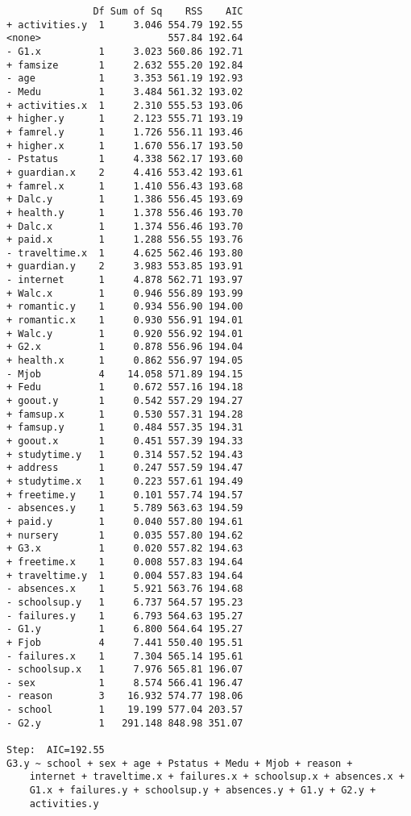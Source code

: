 \documentclass[11pt]{article}
\begin{document}
\begin{enumerate}
\begin{verbatim}
               Df Sum of Sq    RSS    AIC
+ activities.y  1     3.046 554.79 192.55
<none>                      557.84 192.64
- G1.x          1     3.023 560.86 192.71
+ famsize       1     2.632 555.20 192.84
- age           1     3.353 561.19 192.93
- Medu          1     3.484 561.32 193.02
+ activities.x  1     2.310 555.53 193.06
+ higher.y      1     2.123 555.71 193.19
+ famrel.y      1     1.726 556.11 193.46
+ higher.x      1     1.670 556.17 193.50
- Pstatus       1     4.338 562.17 193.60
+ guardian.x    2     4.416 553.42 193.61
+ famrel.x      1     1.410 556.43 193.68
+ Dalc.y        1     1.386 556.45 193.69
+ health.y      1     1.378 556.46 193.70
+ Dalc.x        1     1.374 556.46 193.70
+ paid.x        1     1.288 556.55 193.76
- traveltime.x  1     4.625 562.46 193.80
+ guardian.y    2     3.983 553.85 193.91
- internet      1     4.878 562.71 193.97
+ Walc.x        1     0.946 556.89 193.99
+ romantic.y    1     0.934 556.90 194.00
+ romantic.x    1     0.930 556.91 194.01
+ Walc.y        1     0.920 556.92 194.01
+ G2.x          1     0.878 556.96 194.04
+ health.x      1     0.862 556.97 194.05
- Mjob          4    14.058 571.89 194.15
+ Fedu          1     0.672 557.16 194.18
+ goout.y       1     0.542 557.29 194.27
+ famsup.x      1     0.530 557.31 194.28
+ famsup.y      1     0.484 557.35 194.31
+ goout.x       1     0.451 557.39 194.33
+ studytime.y   1     0.314 557.52 194.43
+ address       1     0.247 557.59 194.47
+ studytime.x   1     0.223 557.61 194.49
+ freetime.y    1     0.101 557.74 194.57
- absences.y    1     5.789 563.63 194.59
+ paid.y        1     0.040 557.80 194.61
+ nursery       1     0.035 557.80 194.62
+ G3.x          1     0.020 557.82 194.63
+ freetime.x    1     0.008 557.83 194.64
+ traveltime.y  1     0.004 557.83 194.64
- absences.x    1     5.921 563.76 194.68
- schoolsup.y   1     6.737 564.57 195.23
- failures.y    1     6.793 564.63 195.27
- G1.y          1     6.800 564.64 195.27
+ Fjob          4     7.441 550.40 195.51
- failures.x    1     7.304 565.14 195.61
- schoolsup.x   1     7.976 565.81 196.07
- sex           1     8.574 566.41 196.47
- reason        3    16.932 574.77 198.06
- school        1    19.199 577.04 203.57
- G2.y          1   291.148 848.98 351.07

Step:  AIC=192.55
G3.y ~ school + sex + age + Pstatus + Medu + Mjob + reason + 
    internet + traveltime.x + failures.x + schoolsup.x + absences.x + 
    G1.x + failures.y + schoolsup.y + absences.y + G1.y + G2.y + 
    activities.y


\end{verbatim}
\end{enumerate}
\end{document}

